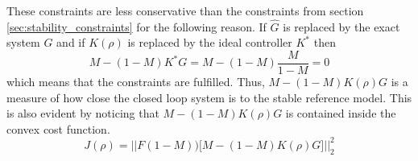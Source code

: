 These constraints are less conservative than the constraints from section \ref{sec:stability_constraints} for the following reason. If $\hat G$ is replaced by the exact system $G$ and if $K(\rho)$ is replaced by the ideal controller $K^*$ then
\begin{equation*}
M -(1-M)K^*G = M - (1-M)\frac{M}{1-M} = 0
\end{equation*}
which means that the constraints are fulfilled. Thus, $M -(1-M)K(\rho)G$ is a measure of how close the closed loop system is to the stable reference model. This is also evident by noticing that $M -(1-M)K(\rho)G$ is contained inside the convex cost function.
\begin{equation*}
    J(\rho) =  \Big|\Big|F(1-M)) \Big[M-(1-M)K(\rho) G\Big]  \Big|\Big|_2^2 
\end{equation*}

